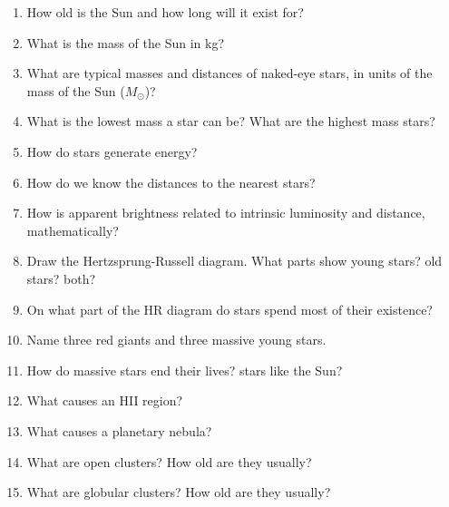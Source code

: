
\begin{enumerate}
\item How old is the Sun and how long will it exist for?
\vspace{80pt}
\item What is the mass of the Sun in kg?
\vspace{80pt}
\item What are typical masses and distances of naked-eye stars, in
  units of the mass of the Sun ($M_\odot$)?
\vspace{80pt}
\item What is the lowest mass a star can be?  What are the highest
  mass stars?
\vspace{80pt}
\item How do stars generate energy?
\vspace{80pt}
\item How do we know the distances to the nearest stars?
\vspace{80pt}
\item How is apparent brightness related to intrinsic luminosity and
  distance, mathematically?
\vspace{80pt}
\item Draw the Hertzsprung-Russell diagram.  What parts show young
  stars? old stars? both?
\vspace{160pt}
\item On what part of the HR diagram do stars spend most of their existence?
\vspace{80pt}
\item Name three red giants and three massive young stars.
\vspace{80pt}
\item How do massive stars end their lives? stars like the Sun?
\vspace{80pt}
\item What causes an HII region? 
\vspace{80pt}
\item What causes a planetary nebula?
\vspace{80pt}
\item What are open clusters? How old are they usually?
\vspace{80pt}
\item What are globular clusters? How old are they usually?
\vspace{80pt}
\end{enumerate}
